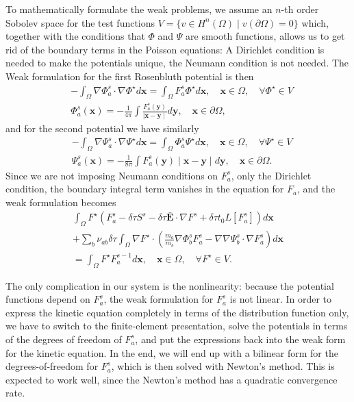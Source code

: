 \documentclass[preprint]{revtex4}
\begin{document}
To mathematically formulate the weak problems, we assume an $n$-th order Sobolev space for the test functions $V=\{v\in H^n(\Omega) \mid v(\partial\Omega)=0 \}$ which, together with the conditions that $\Phi$ and $\Psi$ are smooth functions, allows us to get rid of the boundary terms in the Poisson equations: A Dirichlet condition is needed to make the potentials unique, the Neumann condition is not needed. The Weak formulation for the first Rosenbluth potential is then 
\begin{align}
&-\int_{\Omega}\nabla\Phi_a^s\cdot\nabla\Phi^{\star}d\bm{x}=\int_{\Omega}F_a^s\Phi^{\star}d\bm{x}, \quad \bm{x}\in\Omega, \quad \forall \Phi^{\star}\in V\\
&\Phi_a^s(\bm{x})=-\frac{1}{4\pi}\int \frac{F_a^s(\bm{y})}{\mid \bm{x}-\bm{y}\mid}d\bm{y}, \quad \bm{x}\in\partial\Omega,
\end{align}
and for the second potential we have similarly
\begin{align}
&-\int_{\Omega}\nabla\Psi_a^s\cdot\nabla\Psi^{\star}d\bm{x}=\int_{\Omega}\Phi_a^s\Psi^{\star}d\bm{x}, \quad \bm{x}\in\Omega, \quad \forall \Psi^{\star}\in V\\
&\Psi_a^s(\bm{x})=-\frac{1}{8\pi}\int F_a^s(\bm{y})\mid \bm{x}-\bm{y}\mid d\bm{y}, \quad \bm{x}\in\partial\Omega.
\end{align}
Since we are not imposing Neumann conditions on $F^s_a$, only the Dirichlet condition, the boundary integral term vanishes in the equation for $F_a$, and the weak formulation becomes
\begin{multline}
\int_{\Omega}F^{\star}\left(F_a^s -\delta\tau S^s-\delta\tau\bar{\bm{E}}\cdot\nabla F^s+\delta\tau t_0L[F_a^s]\right)d\bm{x}
\\+\sum_b\nu_{ab}\delta\tau\int_{\Omega}\nabla F^{\star}\cdot\left(\frac{m_a}{m_b}\nabla \Phi_b^s F_a^s-\nabla\nabla\Psi_b^s\cdot\nabla F_a^s\right)d\bm{x}\\
=\int_{\Omega}F^{\star}F_a^{s-1}d\bm{x}, \quad \bm{x}\in\Omega, \quad \forall F^{\star}\in V.
\end{multline}

The only complication in our system is the nonlinearity: because the potential functions depend on $F^s_a$, the weak formulation for $F^s_a$ is not linear. In order to express the kinetic equation completely in terms of the distribution function only, we have to switch to the finite-element presentation, solve the potentials in terms of the degrees of freedom of $F^s_a$, and put the expressions back into the weak form for the kinetic equation. In the end, we will end up with a bilinear form for the degrees-of-freedom for $F_a^s$, which is then solved with Newton's method. This is expected to work well, since the Newton's method has a quadratic convergence rate.
\end{document}
